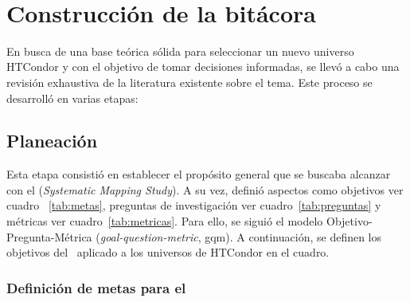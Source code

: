 \label{cap:revisionLiteratura}

\mbox{}\\
\section{Construcción de la bitácora}

En busca de una base teórica sólida para seleccionar un nuevo universo HTCondor y con el objetivo de tomar decisiones informadas, se llevó a cabo una revisión exhaustiva de la literatura existente sobre el tema. Este proceso se desarrolló en varias etapas:


\subsection{Planeación}

Esta etapa consistió en establecer el propósito general que se buscaba alcanzar con el \SMS (\textit{Systematic Mapping Study}).
A su vez, definió aspectos como objetivos ver cuadro ~\ref{tab:metas}, preguntas de investigación ver cuadro~\ref{tab:preguntas} y métricas ver cuadro~\ref{tab:metricas}. Para ello, se siguió el modelo
Objetivo-Pregunta-Métrica (\textit{goal-question-metric}, gqm). A continuación, se definen los objetivos del \SMS\ aplicado
a los universos de HTCondor en el cuadro.

\subsubsection{Definición de metas para el \SMS}

